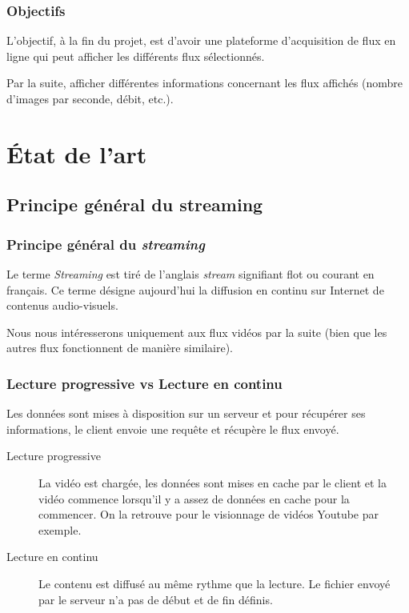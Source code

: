 \documentclass{beamer}
\begin{document}
\begin{frame}	

\frametitle{Objectifs}

L'objectif, à la fin du projet, est d'avoir une plateforme d'acquisition de flux en ligne qui peut afficher les différents flux sélectionnés.

Par la suite, afficher différentes informations concernant les flux affichés (nombre d'images par seconde, débit, etc.).


\end{frame}



\section{\'{E}tat de l'art}

\subsection{Principe général du streaming}


\begin{frame}	
\frametitle{Principe général du \textit{streaming}}

Le terme \textit{Streaming} est tiré de l'anglais \textit{stream} signifiant flot ou courant en français. Ce terme désigne aujourd'hui la diffusion en continu sur Internet de contenus audio-visuels.

Nous nous intéresserons uniquement aux flux vidéos par la suite (bien que les autres flux fonctionnent de manière similaire).


\end{frame}

\begin{frame}	
\frametitle{Lecture progressive vs Lecture en continu}

Les données sont mises à disposition sur un serveur et pour récupérer ses informations, le client envoie une requête et récupère le flux envoyé.

\begin{description}
	\item[Lecture progressive] La vidéo est chargée, les données sont mises en cache par le client et la vidéo commence lorsqu'il y a assez de données en cache pour la commencer. On la retrouve pour le visionnage de vidéos Youtube par exemple.
	\item[Lecture en continu] Le contenu est diffusé au même rythme que la lecture. Le fichier envoyé par le serveur n'a pas de début et de fin définis.
\end{description}


\end{frame}
\end{document}
